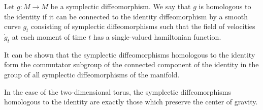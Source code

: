 Let $g: M \to M$ be a symplectic diffeomorphism. We say that $g$ is homologous to the identity if it can be connected to the identity diffeomorphism by a smooth curve $g_t$ consisting of symplectic diffeomorphisms such that the field of velocities $\dot{g}_t$ at each moment of time $t$ has a single-valued hamiltonian function.

It can be shown that the symplectic diffeomorphisms homologous to the identity form the commutator subgroup of the connected component of the identity in the group of all symplectic diffeomorphisms of the manifold.

In the case of the two-dimensional torus, the symplectic diffeomorphisms homologous to the identity are exactly those which preserve the center of gravity.
